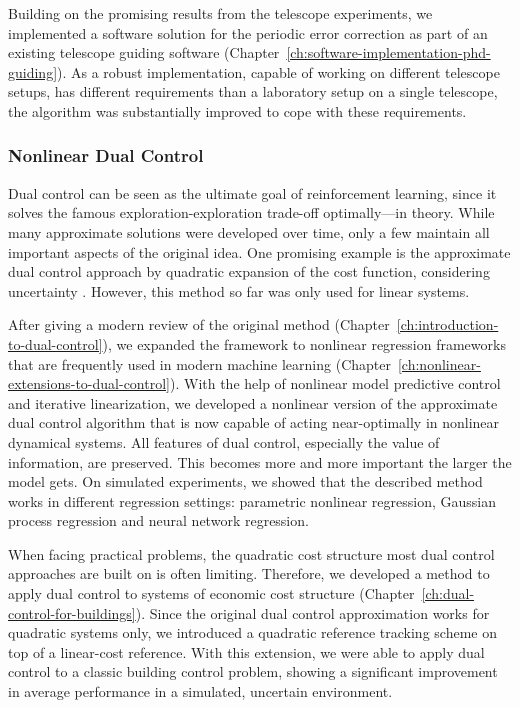 Building on the promising results from the telescope experiments, we
implemented a software solution for the periodic error correction as part of an
existing telescope guiding software
(Chapter~\ref{ch:software-implementation-phd-guiding}). As a robust
implementation, capable of working on different telescope setups, has different
requirements than a laboratory setup on a single telescope, the algorithm was
substantially improved to cope with these requirements.

\subsubsection{Nonlinear Dual Control}

Dual control can be seen as the ultimate goal of reinforcement learning, since
it solves the famous exploration-exploration trade-off optimally---in theory.
While many approximate solutions were developed over time, only a few maintain
all important aspects of the original idea. One promising example is the
approximate dual control approach by quadratic expansion of the cost function,
considering uncertainty \cite{Tse.Bar-Shalom:1973:Actively}. However, this
method so far was only used for linear systems.

After giving a modern review of the original method
(Chapter~\ref{ch:introduction-to-dual-control}), we expanded the framework to
nonlinear regression frameworks that are frequently used in modern machine
learning (Chapter~\ref{ch:nonlinear-extensions-to-dual-control}). With the help
of nonlinear model predictive control and iterative linearization, we developed
a nonlinear version of the approximate dual control algorithm that is now
capable of acting near-optimally in nonlinear dynamical systems. All features
of dual control, especially the value of information, are preserved. This
becomes more and more important the larger the model gets. On simulated
experiments, we showed that the described method works in different regression
settings: parametric nonlinear regression, Gaussian process regression and
neural network regression.

When facing practical problems, the quadratic cost structure most dual
control approaches are built on is often limiting. Therefore, we developed
a method to apply dual control to systems of economic cost structure
(Chapter~\ref{ch:dual-control-for-buildings}). Since the original dual control
approximation works for quadratic systems only, we introduced a quadratic
reference tracking scheme on top of a linear-cost reference. With this
extension, we were able to apply dual control to a classic building control
problem, showing a significant improvement in average performance in a
simulated, uncertain environment.

